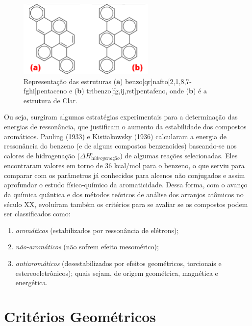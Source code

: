 \begin{figure}[htb]
	\caption{\label{fig:exampledd}Representação das estruturas (\textbf{a}) benzo[qr]nafto[2,1,8,7-fghi]pentaceno e (\textbf{b}) tribenzo[fg,ij,rst]pentafeno, onde (\textbf{b}) é a estrutura de Clar.}
	\begin{center}
		\includegraphics[width=0.60\textwidth]{images/fig2(5).png}
	\end{center}
\end{figure}

Ou seja, surgiram algumas estratégias experimentais para a determinação das energias de ressonância, que justificam o aumento da estabilidade dos compostos aromáticos. Pauling (1933) \autocite{Pauling1933, Pauling1936} e Kistiakowsky (1936) calcularam a energia de ressonância do benzeno (e de alguns compostos benzenoides) baseando-se nos calores de hidrogenação ($\Delta H^{\circ}_{\textit{hidrogenação}}$) de algumas reações selecionadas. Eles encontraram valores em torno de 36 kcal/mol para o benzeno, o que serviu para comparar com os parâmetros já conhecidos para alcenos não conjugados e assim aprofundar o estudo físico-químico da aromaticidade. Dessa forma, com o avanço da química quântica e dos métodos teóricos de análise dos arranjos atômicos no século XX, evoluíram também os critérios para se avaliar se os compostos podem ser classificados como:

\begin{enumerate}
    \item \textit{aromáticos} (estabilizados por ressonância de elétrons);
    \item \textit{não-aromáticos} (não sofrem efeito mesomérico);
    \item \textit{antiaromáticos} (desestabilizados por efeitos geométricos, torcionais e estereoeletrônicos); quais sejam, de origem geométrica, magnética e energética. 
\end{enumerate}

\section{Critérios Geométricos}

